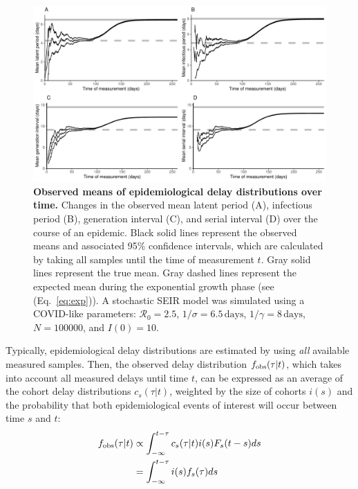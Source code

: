\documentclass[12pt]{article}
\newcommand{\eref}[1]{(Eq.~\ref{eq:#1})}
\begin{document}
\begin{figure}[!th]
\includegraphics[width=\textwidth]{figure_seir.pdf}
\caption{
\textbf{Observed means of epidemiological delay distributions over time.}
Changes in the observed mean latent period (A), infectious period (B), generation interval (C), and serial interval (D) over the course of an epidemic.
Black solid lines represent the observed means and associated 95\% confidence intervals, which are calculated by taking all samples until the time of measurement $t$.
Gray solid lines represent the true mean.
Gray dashed lines represent the expected mean during the exponential growth phase (see \eref{exp}).
A stochastic SEIR model was simulated using a COVID-like parameters: $\mathcal R_0 = 2.5$, $1/\sigma = 6.5\,\textrm{days}$, $1/\gamma = 8\,\textrm{days}$, $N=100000$, and $I(0)=10$.
}
\label{fig:seir}
\end{figure}

Typically, epidemiological delay distributions are estimated by using \emph{all} available measured samples.
Then, the observed delay distribution $f_{\tiny\textrm{obs}}(\tau|t)$, which takes into account all measured delays until time $t$, can be expressed as an average of the cohort delay distributions $c_s(\tau|t)$, weighted by the size of cohorts $i(s)$ and the probability that both epidemiological events of interest will occur between time $s$ and $t$:
\begin{equation}
\begin{aligned}
f_{\tiny\textrm{obs}}(\tau|t) &\propto \int_{-\infty}^{t-\tau} c_s(\tau|t) i(s) F_s(t-s) ds\\
&= \int_{-\infty}^{t-\tau} i(s) f_s(\tau) ds
\end{aligned}
\end{equation}
\end{document}
